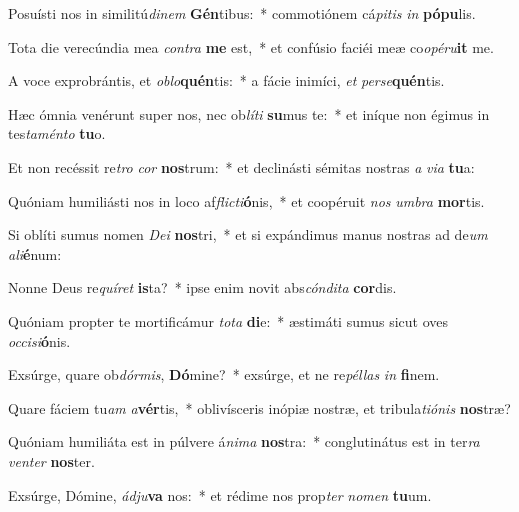 \item Posuísti nos in similitú\textit{di}\textit{nem} \textbf{Gén}tibus:~* commotiónem cá\textit{pi}\textit{tis} \textit{in} \textbf{pó}\textbf{pu}lis.
\item Tota die verecúndia mea \textit{con}\textit{tra} \textbf{me} est,~* et confúsio faciéi meæ co\textit{o}\textit{pé}\textit{ru}\textbf{it} me.
\item A voce exprobrántis, et \textit{ob}\textit{lo}\textbf{quén}tis:~* a fácie inimíci, \textit{et} \textit{per}\textit{se}\textbf{quén}tis.
\item Hæc ómnia venérunt super nos, nec ob\textit{lí}\textit{ti} \textbf{su}mus te:~* et iníque non égimus in tes\textit{ta}\textit{mén}\textit{to} \textbf{tu}o.
\item Et non recéssit re\textit{tro} \textit{cor} \textbf{nos}trum:~* et declinásti sémitas nostras \textit{a} \textit{vi}\textit{a} \textbf{tu}a:
\item Quóniam humiliásti nos in loco af\textit{flic}\textit{ti}\textbf{ó}nis,~* et coopéruit \textit{nos} \textit{um}\textit{bra} \textbf{mor}tis.
\item Si oblíti sumus nomen \textit{De}\textit{i} \textbf{nos}tri,~* et si expándimus manus nostras ad de\textit{um} \textit{a}\textit{li}\textbf{é}num:
\item Nonne Deus re\textit{quí}\textit{ret} \textbf{is}ta?~* ipse enim novit abs\textit{cón}\textit{di}\textit{ta} \textbf{cor}dis.
\item Quóniam propter te mortificámur \textit{to}\textit{ta} \textbf{di}e:~* æstimáti sumus sicut oves \textit{oc}\textit{ci}\textit{si}\textbf{ó}nis.
\item Exsúrge, quare ob\textit{dór}\textit{mis}, \textbf{Dó}mine?~* exsúrge, et ne re\textit{pél}\textit{las} \textit{in} \textbf{fi}nem.
\item Quare fáciem tu\textit{am} \textit{a}\textbf{vér}tis,~* oblivísceris inópiæ nostræ, et tribula\textit{ti}\textit{ó}\textit{nis} \textbf{nos}træ?
\item Quóniam humiliáta est in púlvere á\textit{ni}\textit{ma} \textbf{nos}tra:~* conglutinátus est in ter\textit{ra} \textit{ven}\textit{ter} \textbf{nos}ter.
\item Exsúrge, Dómine, \textit{ád}\textit{ju}\textbf{va} nos:~* et rédime nos prop\textit{ter} \textit{no}\textit{men} \textbf{tu}um.
